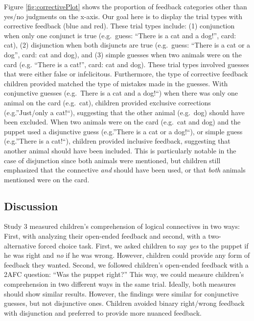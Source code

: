 \documentclass[floatsintext,man]{apa6}
\theoremstyle{definition}
\theoremstyle{definition}
\theoremstyle{definition}
\theoremstyle{remark}
\begin{document}
Figure \ref{fig:correctivePlot} shows the proportion of feedback
categories other than yes/no judgments on the x-axis. Our goal here is
to display the trial types with corrective feedback (blue and red).
These trial types include: (1) conjunction when only one conjunct is
true (e.g.~guess: \enquote{There is a cat and a dog!}, card: cat), (2)
disjunction when both disjuncts are true (e.g.~guess: \enquote{There is
a cat or a dog}, card: cat and dog), and (3) simple guesses when two
animals were on the card (e.g. \enquote{There is a cat!}, card: cat and
dog). These trial types involved guesses that were either false or
infelicitous. Furthermore, the type of corrective feedback children
provided matched the type of mistakes made in the guesses. With
conjunctive guesses (e.g.~There is a cat and a dog!\enquote{) when there
was only one animal on the card (e.g.~cat), children provided exclusive
corrections (e.g.}Just/only a cat!\enquote{), suggesting that the other
animal (e.g.~dog) should have been excluded. When two animals were on
the card (e.g.~cat and dog) and the puppet used a disjunctive guess
(e.g.}There is a cat or a dog!\enquote{), or simple guess (e.g.}There is
a cat!``), children provided inclusive feedback, suggesting that another
animal should have been included. This is particularly notable in the
case of disjunction since both animals were mentioned, but children
still emphasized that the connective \emph{and} should have been used,
or that \emph{both} animals mentioned were on the card.

\subsection{Discussion}\label{discussion-2}

Study 3 measured children's comprehension of logical connectives in two
ways: First, with analyzing their open-ended feedback and second, with a
two-alternative forced choice task. First, we asked children to say
\emph{yes} to the puppet if he was right and \emph{no} if he was wrong.
However, children could provide any form of feedback they wanted.
Second, we followed children's open-ended feedback with a 2AFC question:
\enquote{Was the puppet right?} This way, we could measure children's
comprehension in two different ways in the same trial. Ideally, both
measures should show similar results. However, the findings were similar
for conjunctive guesses, but not disjunctive ones. Children avoided
binary right/wrong feedback with disjunction and preferred to provide
more nuanced feedback.
\end{document}
